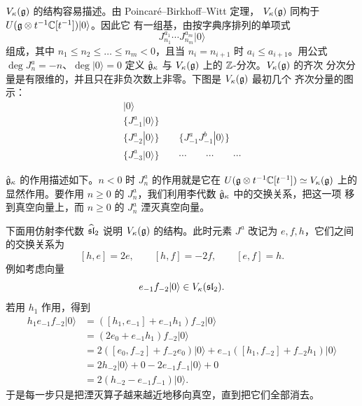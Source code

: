 $V_\kappa(\mathfrak{g})$ 的结构容易描述。由 Poincar\'e--Birkhoff--Witt 定理，
$V_\kappa(\mathfrak{g})$ 同构于 $U(\mathfrak{g}\otimes t^{-1}\mathbb{C}[t^{-1}])|0\rangle$。因此它
有一组基，由按字典序排列的单项式
\begin{equation}
    J^{a_1}_{n_1}\cdots J^{a_m}_{n_m}|0\rangle
    \tag{2.2-5}
\end{equation}
组成，其中 $n_1\le n_2\le\dots\le n_m<0$，且当 $n_i=n_{i+1}$ 时
$a_i\le a_{i+1}$。用公式 $\deg J^a_n=-n$、$\deg|0\rangle=0$ 定义
$\hat{\mathfrak{g}}_\kappa$ 与 $V_\kappa(\mathfrak{g})$ 上的 $\mathbb{Z}$-分次。$V_\kappa(\mathfrak{g})$ 的齐次
分次分量是有限维的，并且只在非负次数上非零。下图是 $V_\kappa(\mathfrak{g})$ 最初几个
齐次分量的图示：
\[
    \begin{array}{c}
        |0\rangle\\[3pt]
        \{J^a_{-1}|0\rangle\}\\[3pt]
        \{J^a_{-2}|0\rangle\}\qquad\{J^a_{-1}J^b_{-1}|0\rangle\}\\[3pt]
        \{J^a_{-3}|0\rangle\}\qquad\cdots\qquad\cdots\qquad\cdots
    \end{array}
\]

$\hat{\mathfrak{g}}_\kappa$ 的作用描述如下。$n<0$ 时 $J^a_n$ 的作用就是它在
$U(\mathfrak{g}\otimes t^{-1}\mathbb{C}[t^{-1}])\simeq V_\kappa(\mathfrak{g})$ 上的显然作用。要作用
$n\ge0$ 的 $J^a_n$，我们利用李代数 $\hat{\mathfrak{g}}_\kappa$ 中的交换关系，把这一项
移到真空向量上，而 $n\ge0$ 的 $J^a_n$ 湮灭真空向量。

下面用仿射李代数 $\widehat{\mathfrak{sl}}_2$ 说明 $V_\kappa(\mathfrak{g})$ 的结构。此时元素
$J^a$ 改记为 $e,f,h$，它们之间的交换关系为
\[
    [h,e]=2e,\qquad[h,f]=-2f,\qquad[e,f]=h.
\]
例如考虑向量
\[
    e_{-1}f_{-2}|0\rangle\in V_\kappa(\mathfrak{sl}_2).
\]
若用 $h_1$ 作用，得到
\[
    \begin{aligned}
        h_1e_{-1}f_{-2}|0\rangle
        &=\left([h_1,e_{-1}]+e_{-1}h_1\right)f_{-2}|0\rangle\\
        &=\left(2e_0+e_{-1}h_1\right)f_{-2}|0\rangle\\
        &=2\left([e_0,f_{-2}]+f_{-2}e_0\right)|0\rangle
        +e_{-1}\left([h_1,f_{-2}]+f_{-2}h_1\right)|0\rangle\\
        &=2h_{-2}|0\rangle+0-2e_{-1}f_{-1}|0\rangle+0\\
        &=2\left(h_{-2}-e_{-1}f_{-1}\right)|0\rangle.
    \end{aligned}
\]
于是每一步只是把湮灭算子越来越近地移向真空，直到把它们全部消去。

